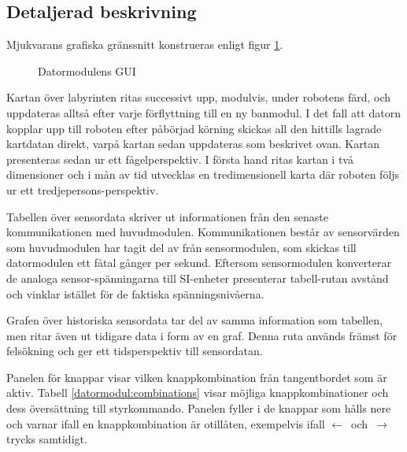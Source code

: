\documentclass[11pt]{article}
\begin{document}
\begin{flushleft}
\subsection{Detaljerad beskrivning}
Mjukvarans grafiska gränssnitt konstrueras enligt figur \ref{datormodul:software}.

\begin{figure}[htbp]
\centering
\noindent\resizebox{.5\linewidth}{!}{
	}
	\caption{Datormodulens GUI \label{datormodul:software}}	
\end{figure}

Kartan över labyrinten ritas successivt upp, modulvis, under robotens färd, och uppdateras alltså efter varje förflyttning till en ny banmodul. I det fall att datorn kopplar upp till roboten efter påbörjad körning skickas all den hittills lagrade kartdatan direkt, varpå kartan sedan uppdateras som beskrivet ovan. Kartan presenteras sedan ur ett fågelperspektiv. I första hand ritas kartan i två dimensioner och i mån av tid utvecklas en tredimensionell karta där roboten följs ur ett tredjepersons-perspektiv. 

Tabellen över sensordata skriver ut informationen från den senaste kommunikationen med huvudmodulen. Kommunikationen består av sensorvärden som huvudmodulen har tagit del av från sensormodulen, som skickas till datormodulen ett fåtal gånger per sekund. Eftersom sensormodulen konverterar de analoga sensor-spänningarna till SI-enheter presenterar tabell-rutan avstånd och vinklar istället för de faktiska spänningsnivåerna. 

Grafen över historiska sensordata tar del av samma information som tabellen, men ritar även ut tidigare data i form av en graf. Denna ruta används främst för felsökning och ger ett tidsperspektiv till sensordatan.

Panelen för knappar visar vilken knappkombination från tangentbordet som är aktiv. Tabell \ref{datormodul:combinations} visar möjliga knappkombinationer och dess översättning till styrkommando. Panelen fyller i de knappar som hålls nere och varnar ifall en knappkombination är otillåten, exempelvis ifall \mbox{$\leftarrow$ och $\rightarrow$} trycks samtidigt.


\end{flushleft}
\end{document}
